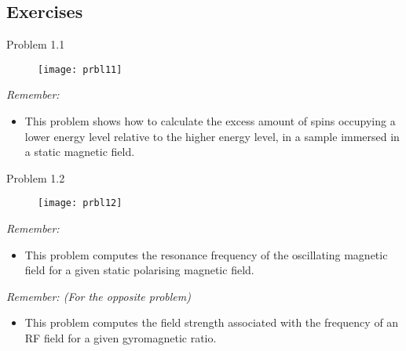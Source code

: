 \subsection{Exercises}

\Large{Problem 1.1}
\begin{figure}[H]
    \centering
    \texttt{[image: prbl11]}
    \label{fig:prbl11}
\end{figure}

\textit{Remember:}
\begin{itemize}
	\item This problem shows how to calculate the excess amount of spins occupying a lower energy level relative to the higher energy level, in a sample immersed in a static magnetic field.
\end{itemize}



\clearpage

\Large{Problem 1.2}
\begin{figure}[H]
    \centering
    \texttt{[image: prbl12]}
    \label{fig:prbl12}
\end{figure}

\textit{Remember:}
\begin{itemize}
	\item This problem computes the resonance frequency of the oscillating magnetic field for a given static polarising magnetic field.
\end{itemize}



\textit{Remember: (For the opposite problem)}
\begin{itemize}
	\item This problem computes the field strength associated with the frequency of an RF field for a given gyromagnetic ratio.
\end{itemize}



